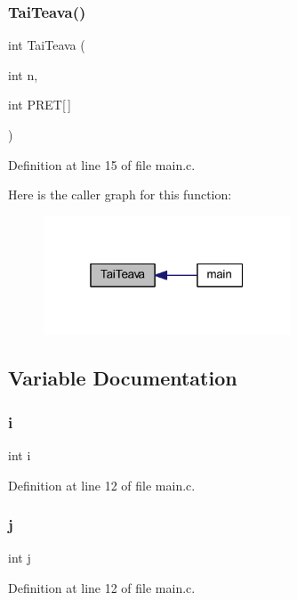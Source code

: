 \subsubsection{Tai\+Teava()}
{\footnotesize\ttfamily int Tai\+Teava (\begin{DoxyParamCaption}\item[{int}]{n,  }\item[{int}]{P\+R\+ET[$\,$] }\end{DoxyParamCaption})}



Definition at line 15 of file main.\+c.

Here is the caller graph for this function\+:
\nopagebreak
\begin{figure}[H]
\begin{center}
\leavevmode
\includegraphics[width=208pt]{main_8c_a716c4869232d48f9b77f6a715ffe0df0_icgraph}
\end{center}
\end{figure}


\subsection{Variable Documentation}
\mbox{\label{main_8c_acb559820d9ca11295b4500f179ef6392}} 
\subsubsection{i}
{\footnotesize\ttfamily int i}



Definition at line 12 of file main.\+c.

\mbox{\label{main_8c_a37d972ae0b47b9099e30983131d31916}} 
\subsubsection{j}
{\footnotesize\ttfamily int j}



Definition at line 12 of file main.\+c.

